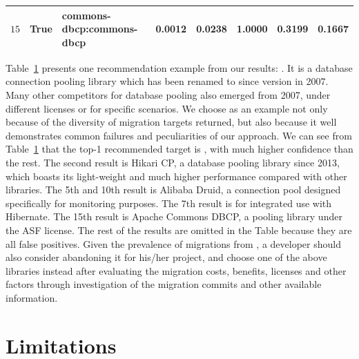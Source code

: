 \documentclass[conference, 10pt]{IEEEtran}
\begin{document}
\begin{table}[]
\begin{tabular}{|l|l|l|r|r|r|r|r|}
 $15$ & True  & commons-dbcp:commons-dbcp                                 & 0.0012 & 0.0238 & 1.0000 & 0.3199 & 0.1667 \\ \hline
\end{tabular}
\label{tab:c3p0}
\vspace{-3.5mm}
\end{table}

Table~\ref{tab:c3p0} presents one recommendation example from our results: . 
It is a database connection pooling library which has been renamed to  since version  in 2007. 
Many other competitors for database pooling also emerged from 2007, under different licenses or for specific scenarios.
We choose  as an example not only because of the diversity of migration targets returned, but also because it well demonstrates common failures and peculiarities of our approach. 
We can see from Table~\ref{tab:c3p0} that the top-1 recommended target is , with much higher confidence than the rest.
The second result is Hikari CP, a database pooling library since 2013, which boasts its light-weight and much higher performance compared with other libraries. 
The 5th and 10th result is Alibaba Druid, a connection pool designed specifically for monitoring purposes. 
The 7th result is  for integrated use with Hibernate. 
The 15th result is Apache Commons DBCP, a pooling library under the ASF license. 
The rest of the results are omitted in the Table because they are all false positives.
Given the prevalence of migrations from , a developer should also consider abandoning it for his/her project, and choose one of the above libraries instead after evaluating the migration costs, benefits, licenses and other factors through investigation of the migration commits and other available information.


\section{Limitations}
\label{sec:limitations}
\end{document}
